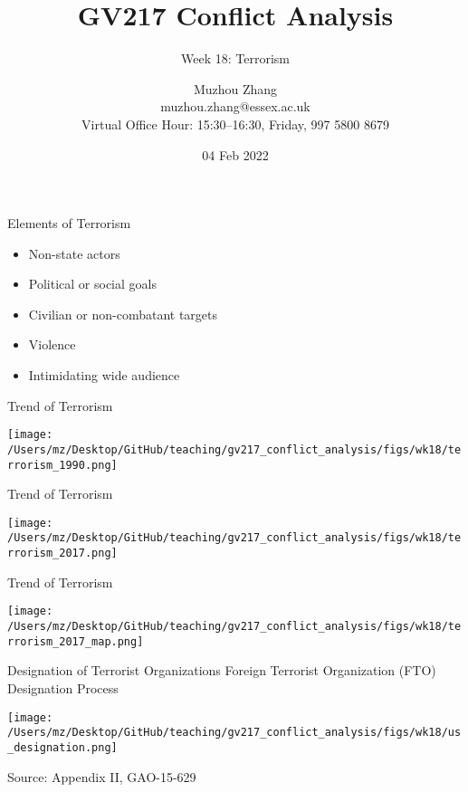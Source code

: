 \documentclass{beamer}
\title{GV217 Conflict Analysis}
\subtitle{Week 18: Terrorism}
\author{Muzhou Zhang\\ muzhou.zhang@essex.ac.uk\\ Virtual Office Hour: 15:30--16:30, Friday, 997 5800 8679}
\date{04 Feb 2022}
\begin{document}
\maketitle
{}

\begin{frame}{Elements of Terrorism}
    \begin{itemize}
        \pause\item Non-state actors
        \pause\item Political or social goals
        \pause\item Civilian or non-combatant targets 
        \pause\item Violence
        \pause\item Intimidating wide audience
    \end{itemize}
\end{frame}

\begin{frame}{Trend of Terrorism}
    \pause
    \begin{center}
        \texttt{[image: /Users/mz/Desktop/GitHub/teaching/gv217\_conflict\_analysis/figs/wk18/terrorism\_1990.png]}
    \end{center}
\end{frame}

\begin{frame}{Trend of Terrorism}
    \pause
    \begin{center}
        \texttt{[image: /Users/mz/Desktop/GitHub/teaching/gv217\_conflict\_analysis/figs/wk18/terrorism\_2017.png]}
    \end{center}
\end{frame}

\begin{frame}{Trend of Terrorism}
    \pause
    \begin{center}
        \texttt{[image: /Users/mz/Desktop/GitHub/teaching/gv217\_conflict\_analysis/figs/wk18/terrorism\_2017\_map.png]}
    \end{center}
\end{frame}

\begin{frame}{Designation of Terrorist Organizations}
    \pause
    Foreign Terrorist Organization (FTO) Designation Process
    \begin{center}
        \texttt{[image: /Users/mz/Desktop/GitHub/teaching/gv217\_conflict\_analysis/figs/wk18/us\_designation.png]}
    \end{center}
    \footnotesize Source: Appendix II, GAO-15-629
\end{frame}
\end{document}
